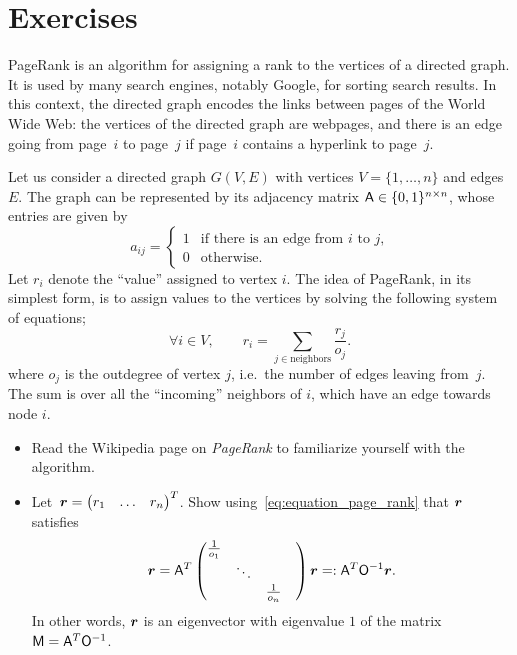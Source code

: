 \section{Exercises}
\begin{exercise}
    PageRank is an algorithm for assigning a rank to the vertices of a directed graph.
    It is used by many search engines, notably Google,
    for sorting search results.
    In this context,
    the directed graph encodes the links between pages of the World Wide Web:
    the vertices of the directed graph are webpages,
    and there is an edge going from page~$i$ to page~$j$ if page~$i$ contains a hyperlink to page~$j$.

    Let us consider a directed graph $G(V, E)$ with vertices $V = \{1, \dotsc, n\}$ and edges $E$.
    The graph can be represented by its adjacency matrix $\mathsf A \in \{0, 1\}^{n \times n}$,
    whose entries are given by
    \[
        a_{ij} =
        \begin{cases}
            1 & \text{if there is an edge from $i$ to $j$,} \\
            0 & \text{otherwise.}
        \end{cases}
    \]
    Let $r_i$ denote the ``value'' assigned to vertex $i$.
    The idea of PageRank, in its simplest form,
    is to assign values to the vertices
    by solving the following system of equations;
    \begin{equation}
        \label{eq:equation_page_rank}
        \forall i \in V, \qquad
        r_i
        = \sum_{j \in \text{neighbors}} \frac{r_j}{o_j}.
    \end{equation}
    where $o_j$ is the outdegree of vertex $j$,
    i.e.\ the number of edges leaving from~$j$.
    The sum is over all the ``incoming'' neighbors of $i$,
    which have an edge towards node $i$.
    \begin{itemize}
        \item
            Read the Wikipedia page on \emph{PageRank} to familiarize yourself with the algorithm.

        \item
            Let~$\mathbf{\boldsymbol{r}} = \begin{pmatrix} r_1 & \hdots & r_n \end{pmatrix}^T$.
            Show using~\eqref{eq:equation_page_rank} that $\mathbf{\boldsymbol{r}}$ satisfies
            \[
                \mathbf{\boldsymbol{r}} =
                \mathsf A^T
                \begin{pmatrix}
                    \frac{1}{o_1} & & & \\
                                  & \ddots & \\
                                  & & \frac{1}{o_n}
                \end{pmatrix}
                \mathbf{\boldsymbol{r}} =:  \mathsf A^T \mathsf O^{-1} \mathbf{\boldsymbol{r}}.
            \]
            In other words, $\mathbf{\boldsymbol{r}}$ is an eigenvector with eigenvalue $1$ of the matrix $\mathsf M = \mathsf A^T \mathsf O^{-1}$.


\end{itemize}
\end{exercise}
